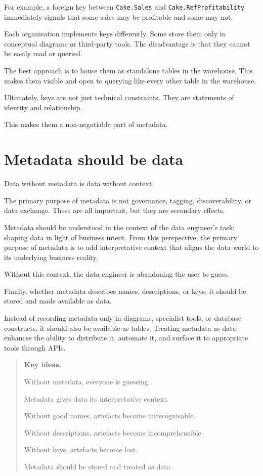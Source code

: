 \documentclass[10pt,openany,10pt]{book}
\begin{document}
For example, a foreign key between \texttt{Cake.Sales} and
\texttt{Cake.RefProfitability} immediately signals that some sales may
be profitable and some may not.

Each organisation implements keys differently. Some store them only in
conceptual diagrams or third-party tools. The disadvantage is that they
cannot be easily read or queried.

The best approach is to house them as standalone tables in the
warehouse. This makes them visible and open to querying like every other
table in the warehouse.

Ultimately, keys are not just technical constraints. They are statements
of identity and relationship.

This makes them a non-negotiable part of metadata.

\section{Metadata should be data}\label{metadata-should-be-data}

Data without metadata is data without context.

The primary purpose of metadata is not governance, tagging,
discoverability, or data exchange. These are all important, but they are
secondary effects.

Metadata should be understood in the context of the data engineer's
task: shaping data in light of business intent. From this perspective,
the primary purpose of metadata is to add interpretative context that
aligns the data world to its underlying business reality.

Without this context, the data engineer is abandoning the user to guess.

Finally, whether metadata describes names, descriptions, or keys, it
should be stored and made available as data.

Instead of recording metadata only in diagrams, specialist tools, or
database constructs, it should also be available as tables. Treating
metadata as data enhances the ability to distribute it, automate it, and
surface it to appropriate tools through APIs.

\begin{quote}
\textbf{Key ideas.}

Without metadata, everyone is guessing.

Metadata gives data its interpretative context.

Without good names, artefacts become unrecognisable.

Without descriptions, artefacts become incomprehensible.

Without keys, artefacts become lost.

Metadata should be stored and treated as data.
\end{quote}
\end{document}
